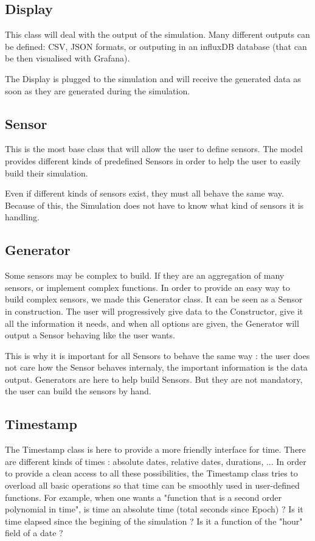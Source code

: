 \subsection{Display}

This class will deal with the output of the simulation. Many different outputs
can be defined: CSV, JSON formats, or outputing in an influxDB database (that
can be then visualised with Grafana).

The Display is plugged to the simulation and will receive the generated data
as soon as they are generated during the simulation.


\subsection{Sensor}

This is the most base class that will allow the user to define sensors. The
model provides different kinds of predefined Sensors in order to help the user
to easily build their simulation.

Even if different kinds of sensors exist, they must all behave the same
way. Because of this, the Simulation does not have to know what kind of sensors
it is handling.

\subsection{Generator}

Some sensors may be complex to build. If they are an aggregation of many
sensors, or implement complex functions. In order to provide an easy way to
build complex sensors, we made this Generator class. It can be seen as a Sensor
in construction. The user will progressively give data to the Constructor, give
it all the information it needs, and when all options are given, the Generator
will output a Sensor behaving like the user wants.

This is why it is important for all Sensors to behave the same way : the user
does not care how the Sensor behaves internaly, the important information is
the data output. Generators are here to help build Sensors. But they are not
mandatory, the user can build the sensors by hand.

\subsection{Timestamp}

The Timestamp class is here to provide a more friendly interface for
time. There are different kinds of times : absolute dates, relative dates,
durations, ... In order to provide a clean access to all these possibilities,
the Timestamp class tries to overload all basic operations so that time can
be smoothly used in user-defined functions. For example, when one wants a
"function that is a second order polynomial in time", is time an absolute
time (total seconds since Epoch) ? Is it time elapsed since the begining of
the simulation ? Is it a function of the "hour" field of a date ?

